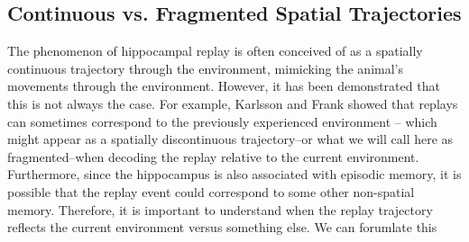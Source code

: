 \documentclass[conference]{IEEEtran}
\begin{document}
\subsection{Continuous vs. Fragmented Spatial Trajectories}
The phenomenon of hippocampal replay is often conceived of as a spatially continuous trajectory through the environment, mimicking the animal's movements through the environment. However, it has been demonstrated that this is not always the case. For example, Karlsson and Frank \cite{KarlssonAwakereplayremote2009} showed that replays can sometimes correspond to the previously experienced environment -- which might appear as a spatially discontinuous trajectory--or what we will call here as fragmented--when decoding the replay relative to the current environment. Furthermore, since the hippocampus is also associated with episodic memory, it is possible that the replay event could correspond to some other non-spatial memory. Therefore, it is important to understand when the replay trajectory reflects the current environment versus something else. We can forumlate this 
\end{document}
